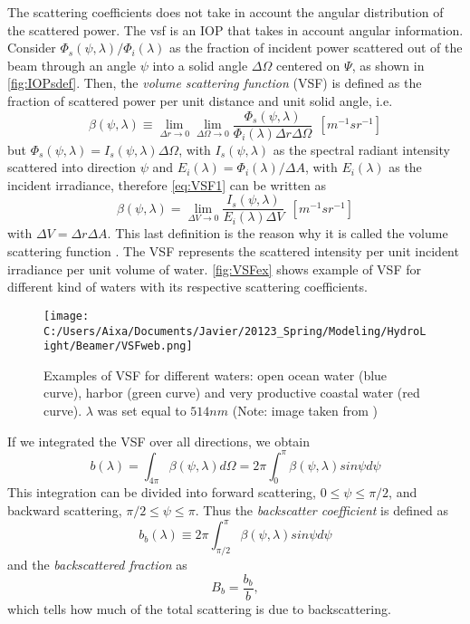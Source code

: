 The scattering coefficients does not take in account the angular distribution of the scattered power. The \gls{vsf} is an IOP that takes in account angular information. Consider $\Phi_s(\psi,\lambda)/\Phi_i(\lambda)$ as the fraction of incident power scattered out of the beam through an angle $\psi$ into a solid angle $\Delta\Omega$ centered on $\Psi$, as shown in \autoref{fig:IOPsdef}. Then, the {\it volume scattering function} (VSF)  is defined as the fraction of scattered power per unit distance and unit solid angle, i.e.
\begin{equation}\label{eq:VSF1}
  \beta(\psi,\lambda)\equiv \lim_{\Delta r\to 0} \lim_{\Delta \Omega\to 0}  \frac{\Phi_s(\psi,\lambda)}{\Phi_i(\lambda)\Delta r\Delta \Omega}~~\left[m^{-1}sr^{-1} \right]
\end{equation}
but $\Phi_s(\psi,\lambda)=I_s(\psi,\lambda)\Delta \Omega$, with $I_s(\psi,\lambda)$ as the spectral radiant intensity scattered into direction $\psi$ and $E_i(\lambda)=\Phi_i(\lambda)/\Delta A$, with $E_i(\lambda)$ as the incident irradiance, therefore \autoref{eq:VSF1} can be written as
\begin{equation} 
  \beta(\psi,\lambda)= \lim_{\Delta V\to 0} \frac{I_s(\psi,\lambda)}{E_i(\lambda)\Delta V}~~\left[m^{-1}sr^{-1} \right]
\end{equation}
with $\Delta V=\Delta r\Delta A$. This last definition is the reason why it is called the volume scattering function \cite{Mobley:2001}. The VSF represents the scattered intensity per unit incident irradiance per unit volume of water. \autoref{fig:VSFex} shows example of VSF for different kind of waters with its respective scattering coefficients.

\begin{figure}[htb]
\centering
      \texttt{[image: C:/Users/Aixa/Documents/Javier/20123\_Spring/Modeling/HydroLight/Beamer/VSFweb.png]}
      \caption{Examples of VSF for different waters: open ocean water (blue curve), harbor (green curve) and very productive coastal water (red curve). $\lambda$ was set equal to $514nm$ (Note: image taken from \cite{Mobley:2001})}
      \label{fig:VSFex}
\end{figure}

If we integrated the VSF over all directions, we obtain
\begin{equation}
  b(\lambda)=\int_{4\pi} \beta(\psi,\lambda)d\Omega=2\pi\int_0^\pi \beta(\psi,\lambda)sin\psi d\psi
\end{equation}
This integration can be divided into forward scattering, $0\leq\psi\leq\pi/2$, and backward scattering, $\pi/2\leq\psi\leq\pi$. Thus the {\it backscatter coefficient}  is defined as
\begin{equation}
  b_b(\lambda)\equiv 2\pi\int_{\pi/2}^\pi \beta(\psi,\lambda)sin\psi d\psi
\end{equation}
and the {\it backscattered fraction}  as 
\begin{equation}
  B_b=\frac{b_b}{b},
\end{equation}
which tells how much of the total scattering is due to backscattering.

